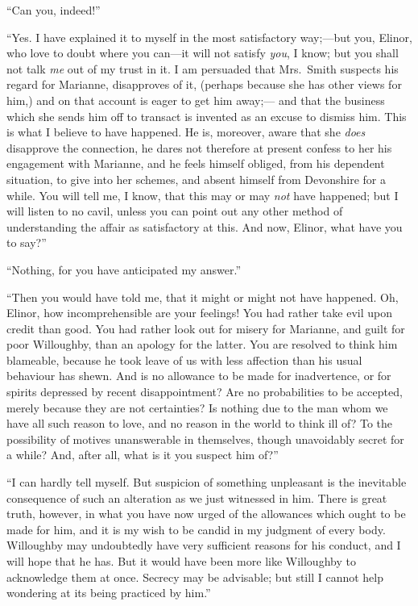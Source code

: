\documentclass{article}
\begin{document}
``Can you, indeed!''

``Yes. I have explained it to myself in the most
satisfactory way;---but you, Elinor, who love to doubt
where you can---it will not satisfy \emph{you}, I know; but you
shall not talk \emph{me} out of my trust in it.  I am persuaded
that Mrs.\ Smith suspects his regard for Marianne,
disapproves of it, (perhaps because she has other views
for him,) and on that account is eager to get him away;---%
and that the business which she sends him off to transact
is invented as an excuse to dismiss him.  This is what I
believe to have happened.  He is, moreover, aware that she
\emph{does} disapprove the connection, he dares not therefore
at present confess to her his engagement with Marianne,
and he feels himself obliged, from his dependent situation,
to give into her schemes, and absent himself from
Devonshire for a while.  You will tell me, I know,
that this may or may \emph{not} have happened; but I will listen
to no cavil, unless you can point out any other method
of understanding the affair as satisfactory at this.
And now, Elinor, what have you to say?''

``Nothing, for you have anticipated my answer.''

``Then you would have told me, that it might or might not
have happened.  Oh, Elinor, how incomprehensible are your
feelings!  You had rather take evil upon credit than good.
You had rather look out for misery for Marianne, and guilt
for poor Willoughby, than an apology for the latter.
You are resolved to think him blameable, because he took
leave of us with less affection than his usual behaviour
has shewn.  And is no allowance to be made for inadvertence,
or for spirits depressed by recent disappointment?  Are
no probabilities to be accepted, merely because they
are not certainties?  Is nothing due to the man whom we
have all such reason to love, and no reason in the world
to think ill of?  To the possibility of motives unanswerable
in themselves, though unavoidably secret for a while?  And,
after all, what is it you suspect him of?''

``I can hardly tell myself.  But suspicion of
something unpleasant is the inevitable consequence
of such an alteration as we just witnessed in him.
There is great truth, however, in what you have now urged
of the allowances which ought to be made for him, and it
is my wish to be candid in my judgment of every body.
Willoughby may undoubtedly have very sufficient
reasons for his conduct, and I will hope that he has.
But it would have been more like Willoughby to acknowledge
them at once.  Secrecy may be advisable; but still I
cannot help wondering at its being practiced by him.''
\end{document}
